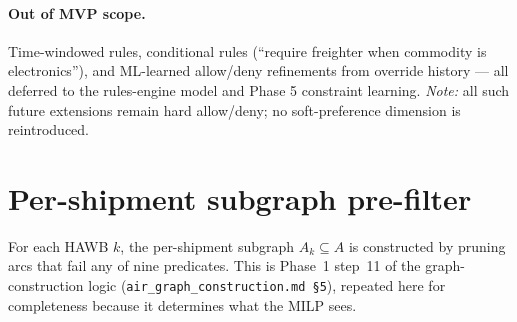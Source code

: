 \documentclass[11pt,a4paper]{article}
\theoremstyle{definition}
\begin{document}
\paragraph{Out of MVP scope.}
Time-windowed rules, conditional rules (``require freighter when commodity
is electronics''), and ML-learned allow/deny refinements from override
history --- all deferred to the rules-engine model and Phase 5
constraint learning. \emph{Note:} all such future extensions remain hard
allow/deny; no soft-preference dimension is reintroduced.

\section{Per-shipment subgraph pre-filter}
\label{sec:prefilter}

For each HAWB $k$, the per-shipment subgraph $A_k \subseteq A$ is constructed
by pruning arcs that fail any of nine predicates. This is Phase~1 step~11 of
the graph-construction logic (\texttt{air\_graph\_construction.md \S5}),
repeated here for completeness because it determines what the MILP sees.
\end{document}
